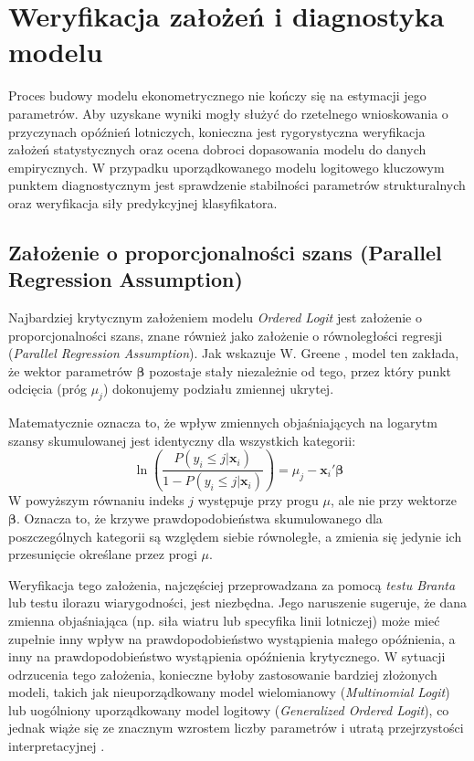 \section{Weryfikacja założeń i diagnostyka modelu}

Proces budowy modelu ekonometrycznego nie kończy się na estymacji jego parametrów. Aby uzyskane wyniki mogły służyć do rzetelnego wnioskowania o przyczynach opóźnień lotniczych, konieczna jest rygorystyczna weryfikacja założeń statystycznych oraz ocena dobroci dopasowania modelu do danych empirycznych. W przypadku uporządkowanego modelu logitowego kluczowym punktem diagnostycznym jest sprawdzenie stabilności parametrów strukturalnych oraz weryfikacja siły predykcyjnej klasyfikatora.

\subsection{Założenie o proporcjonalności szans (Parallel Regression Assumption)}

Najbardziej krytycznym założeniem modelu \textit{Ordered Logit} jest założenie o proporcjonalności szans, znane również jako założenie o równoległości regresji (\textit{Parallel Regression Assumption}). Jak wskazuje W. Greene \cite{greene2003}, model ten zakłada, że wektor parametrów $\boldsymbol{\beta}$ pozostaje stały niezależnie od tego, przez który punkt odcięcia (próg $\mu_j$) dokonujemy podziału zmiennej ukrytej. 

Matematycznie oznacza to, że wpływ zmiennych objaśniających na logarytm szansy skumulowanej jest identyczny dla wszystkich kategorii:
\begin{equation}
    \ln\left( \frac{P(y_i \le j | \mathbf{x}_i)}{1 - P(y_i \le j | \mathbf{x}_i)} \right) = \mu_j - \mathbf{x}_i' \boldsymbol{\beta}
\end{equation}
W powyższym równaniu indeks $j$ występuje przy progu $\mu$, ale nie przy wektorze $\boldsymbol{\beta}$. Oznacza to, że krzywe prawdopodobieństwa skumulowanego dla poszczególnych kategorii są względem siebie równoległe, a zmienia się jedynie ich przesunięcie określane przez progi $\mu$. 

Weryfikacja tego założenia, najczęściej przeprowadzana za pomocą \textit{testu Branta} lub testu ilorazu wiarygodności, jest niezbędna. Jego naruszenie sugeruje, że dana zmienna objaśniająca (np. siła wiatru lub specyfika linii lotniczej) może mieć zupełnie inny wpływ na prawdopodobieństwo wystąpienia małego opóźnienia, a inny na prawdopodobieństwo wystąpienia opóźnienia krytycznego. W sytuacji odrzucenia tego założenia, konieczne byłoby zastosowanie bardziej złożonych modeli, takich jak nieuporządkowany model wielomianowy (\textit{Multinomial Logit}) lub uogólniony uporządkowany model logitowy (\textit{Generalized Ordered Logit}), co jednak wiąże się ze znacznym wzrostem liczby parametrów i utratą przejrzystości interpretacyjnej \cite{maddala1983}.

